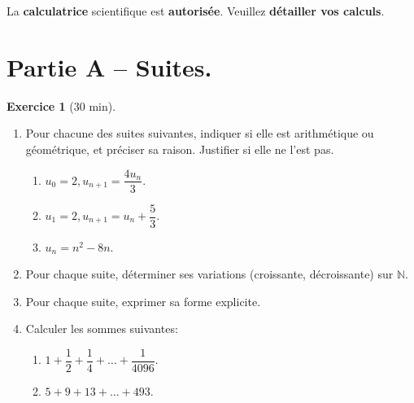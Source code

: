\documentclass{exam}
\theoremstyle{definition}
\newtheorem{exercice}{Exercice}
\begin{document}
\large

\vfill



\begin{center}
 \begin{tcolorbox}[hbox]
   \Large
   La \textbf{calculatrice} scientifique est \textbf{autorisée}. Veuillez \textbf{détailler vos calculs}.
 \end{tcolorbox}
\end{center}





\section*{Partie A -- Suites.}

\begin{exercice}[30 min]
  \begin{enumerate}
    \item Pour chacune des suites suivantes, indiquer si elle est arithmétique ou géométrique, et préciser sa raison. Justifier si elle ne l'est pas.
      \begin{enumerate}
        \item $u_0 = 2, u_{n+1} = \dfrac{4 u_n}{3}$.
        \item $u_1 = 2, u_{n+1} = u_n + \dfrac{5}{3}$.
        \item $u_n = n^2 - 8n$.
      \end{enumerate}
    \item Pour chaque suite, déterminer ses variations (croissante, décroissante) sur $\mathbb{N}$.
    \item Pour chaque suite, exprimer sa forme explicite.
    \item Calculer les sommes suivantes:
      \begin{enumerate}
        \item $1+\dfrac{1}{2}+\dfrac{1}{4}+\dots+\dfrac{1}{4096}$.
        \item $5+9+13+\dots+493$.
      \end{enumerate}
  \end{enumerate}

\end{exercice}
\end{document}
